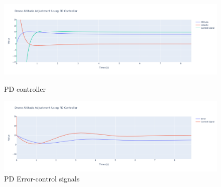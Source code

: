 \documentclass[a4paper,12pt]{article}
\begin{document}
\begin{figure}
    \centering
    \includegraphics[width=1\linewidth,height=0.6
    \linewidth]{photos/Pd.png}
    \caption{PD controller}
    \label{fig:enter-label}
    \centering
    \includegraphics[width=1\linewidth,height=0.6
    \linewidth]{photos/pd_error.png}
    \caption{PD Error-control signals}
    \label{fig:enter-label}
\end{figure}
\end{document}
